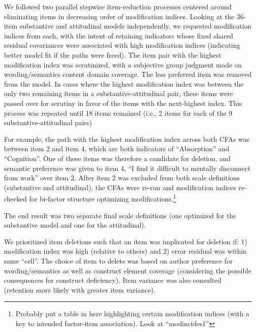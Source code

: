 \documentclass[
  english,
  man]{apa6}
\begin{document}
We followed two parallel stepwise item-reduction processes centered around eliminating items in decreasing order of modification indices. Looking at the 36-item substantive and attitudinal models independently, we requested modification indices from each, with the intent of retaining indicators whose fixed shared residual covariances were associated with high modification indices (indicating better model fit if the paths were freed). The item pair with the highest modification index was scrutinized, with a subjective group judgment made on wording/semantics content domain coverage. The less preferred item was removed from the model. In cases where the highest modification index was between the only two remaining items in a substantive-attitudinal pair, these items were passed over for scrutiny in favor of the items with the next-highest index. This process was repeated until 18 items remained (i.e., 2 items for each of the 9 substantive-attitudinal pairs)

For example, the path with the highest modification index across both CFAs was between item 2 and item 4, which are both indicators of \enquote{Absorption} and \enquote{Cognition}. One of these items was therefore a candidate for deletion, and semantic preference was given to item 4, \enquote{I find it difficult to mentally disconnect from work} over item 2. After item 2 was excluded from both scale definitions (substantive and attitudinal), the CFAs were re-run and modification indices re-checked for bi-factor structure optimizing modifications.\footnote{Probably put a table in here highlighting certain modification indices (with a key to intended factor-item association). Look at \enquote{modincides1}}

The end result was two separate final scale definitions (one optimized for the substantive model and one for the attitudinal).

We prioritized item deletions such that an item was implicated for deletion if: 1) modification index was high (relative to others) and 2) error residual was within same \enquote{cell}. The choice of item to delete was based on author preference for wording/semantics as well as construct element coverage (considering the possible consequences for construct deficiency). Item variance was also consulted (retention more likely with greater item variance).
\end{document}
